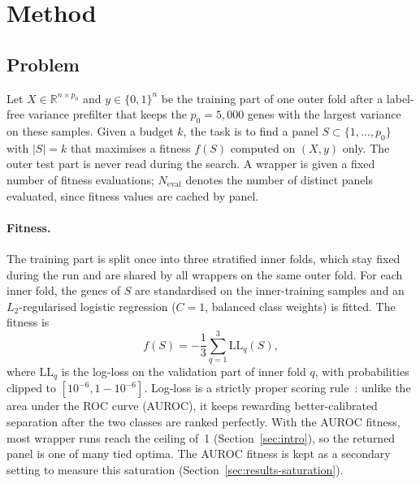 
\section{Method}\label{sec:method}

\subsection{Problem}\label{sec:problem}

Let $X\in\mathbb{R}^{n\times p_0}$ and $y\in\{0,1\}^n$ be the training part of one outer fold after a label-free variance
prefilter that keeps the $p_0=5{,}000$ genes with the largest variance on these samples. Given a budget $k$, the task is to
find a panel $S\subset\{1,\dots,p_0\}$ with $|S|=k$ that maximises a fitness $f(S)$ computed on $(X,y)$ only. The outer test
part is never read during the search. A wrapper is given a fixed number of fitness evaluations; $N_{\mathrm{eval}}$ denotes
the number of distinct panels evaluated, since fitness values are cached by panel.

\paragraph{Fitness.} The training part is split once into three stratified inner folds, which stay fixed during the run and
are shared by all wrappers on the same outer fold. For each inner fold, the genes of $S$ are standardised on the inner-training
samples and an $L_2$-regularised logistic regression ($C=1$, balanced class weights) is fitted. The fitness is
\begin{equation}\label{eq:fitness}
  f(S) = -\frac{1}{3}\sum_{q=1}^{3}\mathrm{LL}_q(S),
\end{equation}
where $\mathrm{LL}_q$ is the log-loss on the validation part of inner fold $q$, with probabilities clipped to
$[10^{-6},1-10^{-6}]$. Log-loss is a strictly proper scoring rule~\cite{gneiting2007}: unlike the area under the ROC curve
(AUROC), it keeps rewarding better-calibrated separation after the two classes are ranked perfectly. With the AUROC fitness,
most wrapper runs reach the ceiling of~1 (Section~\ref{sec:intro}), so the returned panel is one of many tied optima. The AUROC
fitness is kept as a secondary setting to measure this saturation (Section~\ref{sec:results-saturation}).

